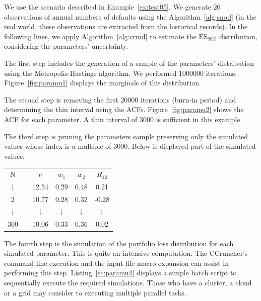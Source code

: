 \documentclass[11pt,fleqn]{book} %
\begin{document}
\begin{example}
	\label{ex:paramu}
	We use the scenario described in Example~\ref{ex:test05}. We generate 20 
	observations of annual numbers of defaults using the Algorithm~\ref{alg:snod} 
	(in the real world, these observations are extracted from the historical 
	records). In the following lines, we apply Algorithm~\ref{alg:crmd} to 
	estimate the $\text{ES}_{99\%}$ distribution, considering the parameters' 
	uncertainty. 

	The first step includes the generation of a sample of the parameters' 
	distribution using the Metropolis-Hastings algorithm. We performed 
	\num{1000000} iterations. Figure~\ref{fig:paramu1} displays the 
	marginals of this distribution.
	
	The second step is removing the first \num{20000} iterations (burn-in 
	period) and determining the thin interval using the ACFs. 
	Figure~\ref{fig:paramu2} shows the ACF for each parameter. A thin interval 
	of \num{3000} is sufficient in this example. 
	
	The third step is pruning the parameters sample preserving 
	only the simulated values whose index is a multiple of \num{3000}. 
	Below is displayed part of the simulated values:

	\hspace*{1cm}
	\begin{tabular}{cc|c|c|c|c|}
		\cline{1-1} \cline{3-6}
		\multicolumn{1}{|c|}{N} & & $\nu$ & $w_1$ & $w_2$ & $R_{12}$ \\
		\cline{1-1} \cline{3-6}
		\multicolumn{1}{|c|}{1} & & 12.54 & 0.29 & 0.48 & 0.21 \\
		\cline{1-1} \cline{3-6}
		\multicolumn{1}{|c|}{2} & & 10.77 & 0.28 & 0.32 & -0.28 \\
		\cline{1-1} \cline{3-6}
		\multicolumn{1}{|c|}{\vdots} & & \vdots & \vdots & \vdots & \vdots \\
		\cline{1-1} \cline{3-6}
		\multicolumn{1}{|c|}{300} & & 10.06 & 0.33 & 0.36 & 0.02 \\
		\cline{1-1} \cline{3-6}
	\end{tabular}

	The fourth step is the simulation of the portfolio loss distribution
	for each simulated parameter. This is quite an intensive computation.
	The CCruncher's command line execution and the input file macro expansion
	can assist in performing this step. Listing~\ref{sc:paramu4} displays a 
	simple batch script to sequentially execute the required simulations.
	Those who have a cluster, a cloud or a grid may consider to executing 
	multiple parallel tasks.


\end{example}
\end{document}
